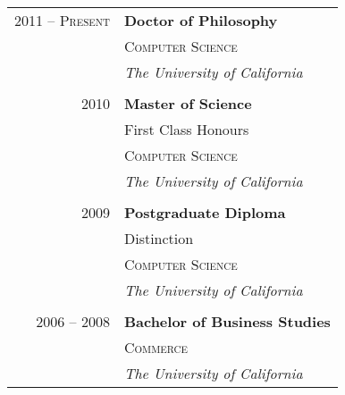 \documentclass[10pt]{article}
\begin{document}
{\begin{minipage}[t]{0.44\textwidth}
\begin{tabular}{rl} %


2011 -- \textsc{Present} & \textbf{Doctor of Philosophy} \\ 
& \textsc{Computer Science} \\ 
& \textit{The University of California}\\
&\\
	 

2010 & \textbf{Master of Science} \\ 
& \small First Class Honours \\
& \textsc{Computer Science} \\ 
& \textit{The University of California}\\
&\\
	 

2009 & \textbf{Postgraduate Diploma}\\
& \small Distinction \\
& \textsc{Computer Science} \\
& \textit{The University of California}\\
&\\
	 

2006 -- 2008 & \textbf{Bachelor of Business Studies}\\
& \textsc{Commerce} \\
& \textit{The University of California} 
	

\end{tabular}\\[10pt]



\end{minipage}}
\end{document}
